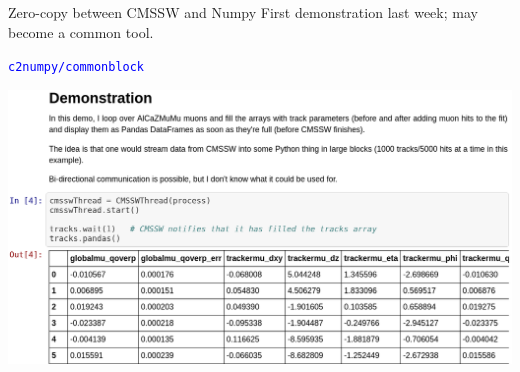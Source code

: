 \documentclass{beamer}
\begin{document}
\begin{frame}{Zero-copy between CMSSW and Numpy}
\vspace{0.5 cm}
First demonstration last week; may become a common tool.

\begin{center}
\textcolor{blue}{\tt c2numpy/commonblock}
\end{center}

\includegraphics[width=\linewidth]{direct-memory.png}
\end{frame}
\end{document}
